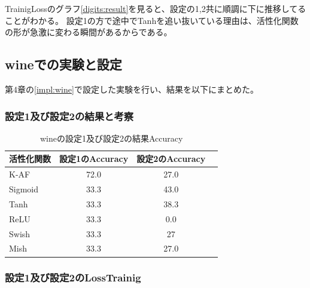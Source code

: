 TrainigLossのグラフ\ref{digits:result}を見ると、設定の1,2共に順調に下に推移してることがわかる。
設定1の方で途中でTanhを追い抜いている理由は、活性化関数の形が急激に変わる瞬間があるからである。


\subsection{wineでの実験と設定}
\label{ev:wineでの実験と設定}

第4章の\ref{impl:wine}で設定した実験を行い、結果を以下にまとめた。
\subsubsection{設定1及び設定2の結果と考察}


\begin{table}[htbp]
    \begin{center}
        \caption{wineの設定1及び設定2の結果Accuracy}
        \vspace{2mm} 
        \begin{tabular}{l*{2}{c}r}
            活性化関数              & 設定1のAccuracy &  設定2のAccuracy \\
            \hline
            K-AF            & 72.0 & 27.0 \\
            Sigmoid            & 33.3 & 43.0\\
            Tanh            & 33.3 & 38.3\\
            ReLU        & 33.3 & 0.0\\
            Swish           & 33.3 & 27 \\
            Mish           & 33.3 &  27.0\\
    
        \end{tabular}
    \end{center}
\end{table}


\subsubsection{設定1及び設定2のLossTrainig}
\label{digits:loss}

